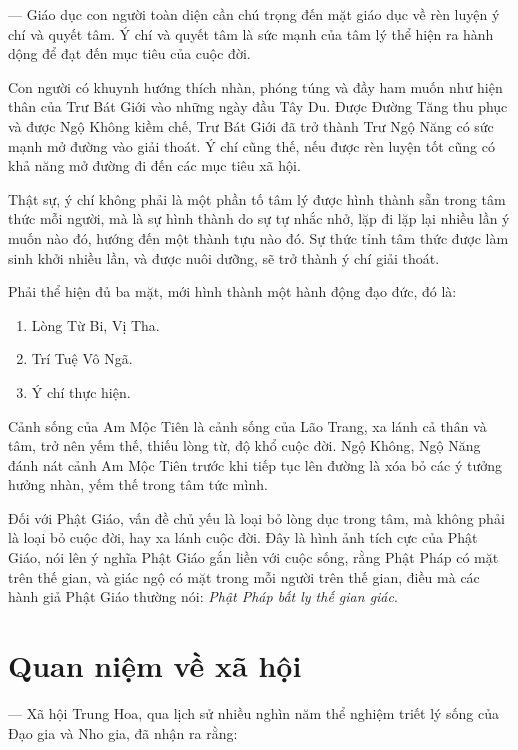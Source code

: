 --- Giáo dục con người toàn diện cần chú trọng đến mặt giáo dục về rèn luyện ý chí và quyết tâm. Ý chí và quyết tâm là sức mạnh của tâm lý thể hiện ra hành dộng để đạt đến mục tiêu của cuộc đời.

Con người có khuynh hướng thích nhàn, phóng túng và đầy ham muốn như hiện thân của Trư Bát Giới vào những ngày đầu Tây Du. Được Đường Tăng thu phục và được Ngộ Không kiềm chế, Trư Bát Giới đã trở thành Trư Ngộ Năng có sức mạnh mở đường vào giải thoát. Ý chí cũng thế, nếu được rèn luyện tốt cũng có khả năng mở đường đi đến các mục tiêu xã hội.

Thật sự, ý chí không phải là một phần tố tâm lý được hình thành sẵn trong tâm thức mỗi người, mà là sự hình thành do sự tự nhắc nhở, lặp đi lặp lại nhiều lần ý muốn nào đó, hướng đến một thành tựu nào đó. Sự thức tỉnh tâm thức được làm sinh khởi nhiều lần, và được nuôi dưỡng, sẽ trở thành ý chí giải thoát.

Phải thể hiện đủ ba mặt, mới hình thành một hành động đạo đức, đó là:

\begin{enumerate}[label=\itshape\arabic*\upshape/]
    \item Lòng Từ Bi, Vị Tha.

    \item Trí Tuệ Vô Ngã.

    \item Ý chí thực hiện.
\end{enumerate}

Cảnh sống của Am Mộc Tiên là cảnh sống của Lão Trang, xa lánh cả thân và tâm, trở nên yếm thế, thiếu lòng từ, độ khổ cuộc đời. Ngộ Không, Ngộ Năng đánh nát cảnh Am Mộc Tiên trước khi tiếp tục lên đường là xóa bỏ các ý tưởng hưởng nhàn, yếm thế trong tâm tức mình.

Đối với Phật Giáo, vấn đề chủ yếu là loại bỏ lòng dục trong tâm, mà không phải là loại bỏ cuộc đời, hay xa lánh cuộc đời. Đây là hình ảnh tích cực của Phật Giáo, nói lên ý nghĩa Phật Giáo gắn liền với cuộc sống, rằng Phật Pháp có mặt trên thế gian, và giác ngộ có mặt trong mỗi người trên thế gian, điều mà các hành giả Phật Giáo thường nói: \emph{Phật Pháp bất ly thế gian giác}.

\section{Quan niệm về xã hội} %
\label{sec:64_xa_hoi}

--- Xã hội Trung Hoa, qua lịch sử nhiều nghìn năm thể nghiệm triết lý sống của Đạo gia và Nho gia, đã nhận ra rằng:


